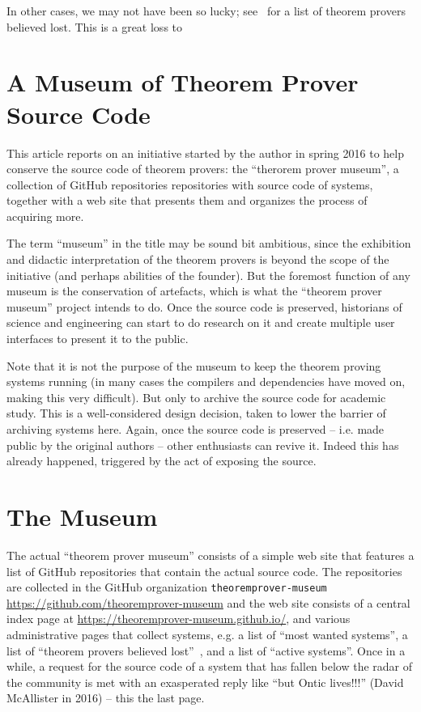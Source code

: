 \documentclass[smallcondensed]{svjour3}
\begin{document}
In other cases, we may not have been so lucky; see~\cite{tpmuseum:tpbl:on} for a list of
theorem provers believed lost. This is a great loss to

\section{A Museum of Theorem Prover Source Code}

This article reports on an initiative started by the author in spring 2016 to help
conserve the source code of theorem provers: the ``therorem prover museum'', a collection
of GitHub repositories repositories with source code of systems, together with a web site
that presents them and organizes the process of acquiring more.

The term ``museum'' in the title may be sound bit ambitious, since the exhibition and
didactic interpretation of the theorem provers is beyond the scope of the initiative (and
perhaps abilities of the founder). But the foremost function of any museum is the
conservation of artefacts, which is what the ``theorem prover museum'' project intends to
do. Once the source code is preserved, historians of science and engineering can start to
do research on it and create multiple user interfaces to present it to the public. 

Note that it is not the purpose of the museum to keep the theorem proving systems running
(in many cases the compilers and dependencies have moved on, making this very
difficult). But only to archive the source code for academic study.  This is a
well-considered design decision, taken to lower the barrier of archiving systems
here. Again, once the source code is preserved -- i.e. made public by the original authors
-- other enthusiasts can revive it. Indeed this has already happened, triggered by the act
of exposing the source.

\section{The Museum}

The actual ``theorem prover museum'' consists of a simple web site that features a list of
GitHub repositories that contain the actual source code. The repositories are collected in
the GitHub organization \texttt{theoremprover-museum}
\url{https://github.com/theoremprover-museum} and the web site consists of a central index
page at \url{https://theoremprover-museum.github.io/}, and various administrative pages
that collect systems, e.g. a list of ``most wanted systems'', a list of ``theorem provers
believed lost''~\cite{tpmuseum:tpbl:on}, and a list of ``active systems''. Once in a
while, a request for the source code of a system that has fallen below the radar of the
community is met with an exasperated reply like ``but Ontic lives!!!'' (David McAllister
in 2016) -- this the last page.
\end{document}
